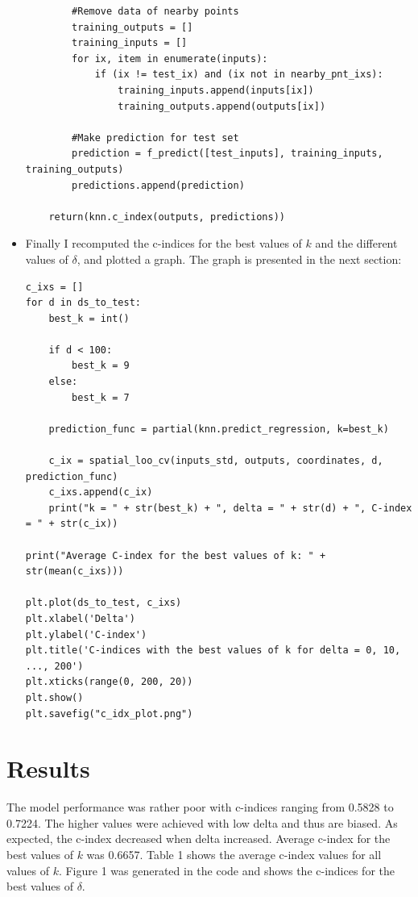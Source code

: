 \documentclass[a4paper]{article}
\begin{document}
\begin{itemize}
\begin{lstlisting}
        #Remove data of nearby points
        training_outputs = []
        training_inputs = []
        for ix, item in enumerate(inputs): 
            if (ix != test_ix) and (ix not in nearby_pnt_ixs):
                training_inputs.append(inputs[ix])
                training_outputs.append(outputs[ix])

        #Make prediction for test set
        prediction = f_predict([test_inputs], training_inputs, training_outputs)
        predictions.append(prediction)

    return(knn.c_index(outputs, predictions))
\end{lstlisting}
\normalsize
\fontfamily{\sfdefault}\selectfont



\item Finally I recomputed the c-indices for the best values of $k$ and the different values of $\delta$, and plotted a graph. The graph is presented in the next section:
\selectfont
\footnotesize
\begin{lstlisting}
c_ixs = []
for d in ds_to_test:
    best_k = int()

    if d < 100:
        best_k = 9
    else: 
        best_k = 7
    
    prediction_func = partial(knn.predict_regression, k=best_k)

    c_ix = spatial_loo_cv(inputs_std, outputs, coordinates, d, prediction_func)
    c_ixs.append(c_ix)
	print("k = " + str(best_k) + ", delta = " + str(d) + ", C-index = " + str(c_ix))

print("Average C-index for the best values of k: " + str(mean(c_ixs)))

plt.plot(ds_to_test, c_ixs)
plt.xlabel('Delta')
plt.ylabel('C-index')
plt.title('C-indices with the best values of k for delta = 0, 10, ..., 200')
plt.xticks(range(0, 200, 20))
plt.show()
plt.savefig("c_idx_plot.png")
\end{lstlisting}
\normalsize
\fontfamily{\sfdefault}\selectfont
\end{itemize}

\newpage
\section{Results}

The model performance was rather poor with c-indices ranging from 0.5828 to 0.7224. The higher values were achieved with low delta and thus are biased. As expected, the c-index decreased when delta increased. Average c-index for the best values of $k$ was 0.6657. Table 1 shows the average c-index values for all values of $k$. Figure 1 was generated in the code and shows the c-indices for the best values of $\delta$.
\end{document}
